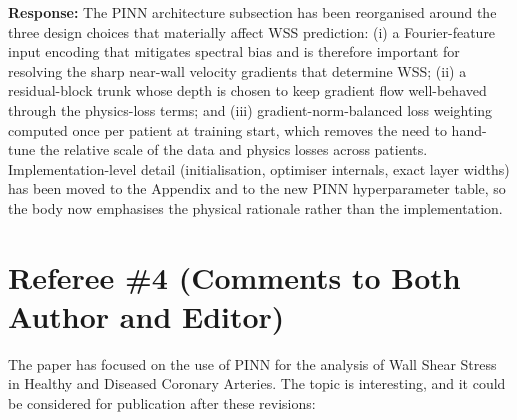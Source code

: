 \documentclass[11pt]{article}
\begin{document}
\begin{enumerate}[]
    \textbf{Response:} The PINN architecture subsection has been reorganised around the three design choices that materially affect WSS prediction: (i) a Fourier-feature input encoding that mitigates spectral bias and is therefore important for resolving the sharp near-wall velocity gradients that determine WSS; (ii) a residual-block trunk whose depth is chosen to keep gradient flow well-behaved through the physics-loss terms; and (iii) gradient-norm-balanced loss weighting computed once per patient at training start, which removes the need to hand-tune the relative scale of the data and physics losses across patients. Implementation-level detail (initialisation, optimiser internals, exact layer widths) has been moved to the Appendix and to the new PINN hyperparameter table, so the body now emphasises the physical rationale rather than the implementation.
\end{enumerate}

\newpage
\section*{Referee \#4 (Comments to Both Author and Editor)}

The paper has focused on the use of PINN for the analysis of Wall Shear Stress in Healthy and Diseased Coronary Arteries. The topic is interesting, and it could be considered for publication after these revisions:
\end{document}
